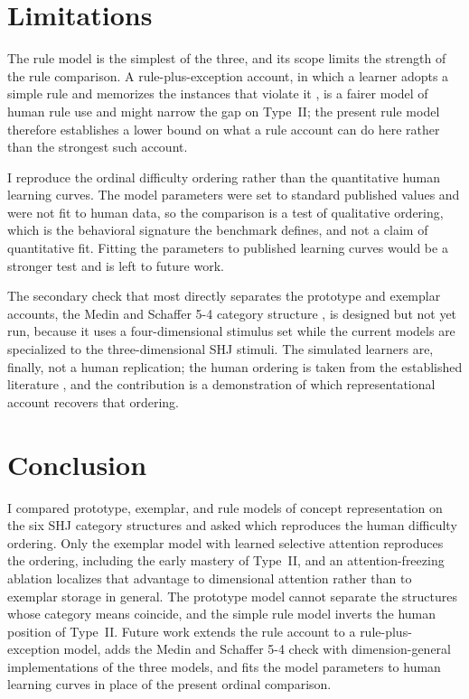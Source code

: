 \documentclass[conference]{IEEEtran}
\begin{document}
\section{Limitations}
The rule model is the simplest of the three, and its scope limits the strength of
the rule comparison. A rule-plus-exception account, in which a learner adopts a
simple rule and memorizes the instances that violate it \cite{nosofsky1994rulex},
is a fairer model of human rule use and might narrow the gap on Type~II; the
present rule model therefore establishes a lower bound on what a rule account can
do here rather than the strongest such account.

I reproduce the ordinal difficulty ordering rather than the quantitative human
learning curves. The model parameters were set to standard published values and
were not fit to human data, so the comparison is a test of qualitative ordering,
which is the behavioral signature the benchmark defines, and not a claim of
quantitative fit. Fitting the parameters to published learning curves would be a
stronger test and is left to future work.

The secondary check that most directly separates the prototype and exemplar
accounts, the Medin and Schaffer 5-4 category structure \cite{medin1978}, is
designed but not yet run, because it uses a four-dimensional stimulus set while
the current models are specialized to the three-dimensional SHJ stimuli. The
simulated learners are, finally, not a human replication; the human ordering is
taken from the established literature \cite{shepard1961,nosofsky1994}, and the
contribution is a demonstration of which representational account recovers that
ordering.

\section{Conclusion}
I compared prototype, exemplar, and rule models of concept representation on the
six SHJ category structures and asked which reproduces the human difficulty
ordering. Only the exemplar model with learned selective attention reproduces the
ordering, including the early mastery of Type~II, and an attention-freezing
ablation localizes that advantage to dimensional attention rather than to
exemplar storage in general. The prototype model cannot separate the structures
whose category means coincide, and the simple rule model inverts the human
position of Type~II. Future work extends the rule account to a rule-plus-exception
model, adds the Medin and Schaffer 5-4 check with dimension-general
implementations of the three models, and fits the model parameters to human
learning curves in place of the present ordinal comparison.
\end{document}

